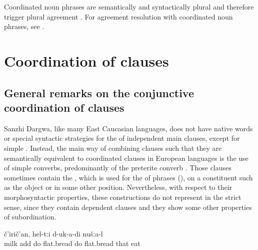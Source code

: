 Coordinated noun phrases are semantically and syntactically plural and therefore trigger plural agreement . For agreement resolution with coordinated noun phrases, see .



\section{Coordination of clauses}
\label{sec:Coordination of clauses other phrases}

\subsection{General remarks on the conjunctive coordination of clauses}
\label{ssec:General remarks on the conjunctive coordination of clauses}


Sanzhi Dargwa, like many East Caucasian languages, does not have native words or special syntactic strategies for the  of independent main clauses, except for simple . Instead, the main way of combining clauses such that they are semantically equivalent to coordinated clauses in European languages is the use of simple converbs, predominantly of the preterite converb . Those clauses sometimes contain the  , which is used for the  of phrases (), on a constituent such as the object or in some other position. Nevertheless, with respect to their morphosyntactic properties, these constructions do not represent  in the strict sense, since they contain dependent clauses and they show some other properties of subordination.
%
\begin{exe}
	\ex	\label{ex:‎We added milk, prepared flat breads and ate them}
		č'irič'an,	hel-tːi	d-uk-a-di	nušːa-l\\
		milk add	do	flat.bread	do	flat.bread	that	eat	\\
	\glt	{}
\end{exe}

